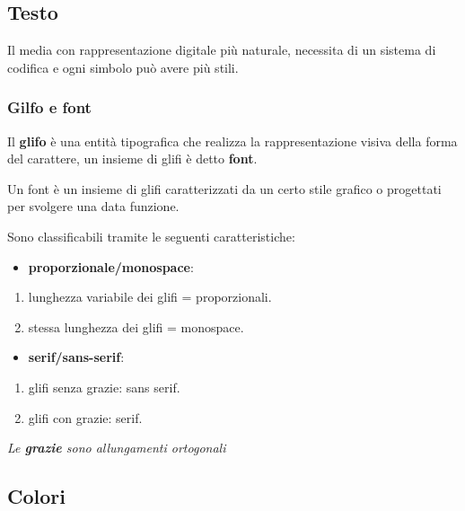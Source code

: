 \subsection{Testo}\label{testo}

Il media con rappresentazione digitale più naturale, necessita di un
sistema di codifica e ogni simbolo può avere più stili.

\subsubsection{Gilfo e font}\label{gilfo-e-font}

Il \textbf{glifo} è una entità tipografica che realizza la
rappresentazione visiva della forma del carattere, un insieme di glifi è
detto \textbf{font}.

Un font è un insieme di glifi caratterizzati da un certo stile grafico o
progettati per svolgere una data funzione.

Sono classificabili tramite le seguenti caratteristiche:

\begin{itemize}
\item
  \textbf{proporzionale/monospace}:
\end{itemize}

\begin{enumerate}
\def\labelenumi{\arabic{enumi}.}
\item
  lunghezza variabile dei glifi = proporzionali.
\item
  stessa lunghezza dei glifi = monospace.
\end{enumerate}

\begin{itemize}
\item
  \textbf{serif/sans-serif}:
\end{itemize}

\begin{enumerate}
\def\labelenumi{\arabic{enumi}.}
\item
  glifi senza grazie: sans serif.
\item
  glifi con grazie: serif.
\end{enumerate}

\emph{Le \textbf{grazie} sono allungamenti ortogonali}

\subsection{Colori}\label{colori}


